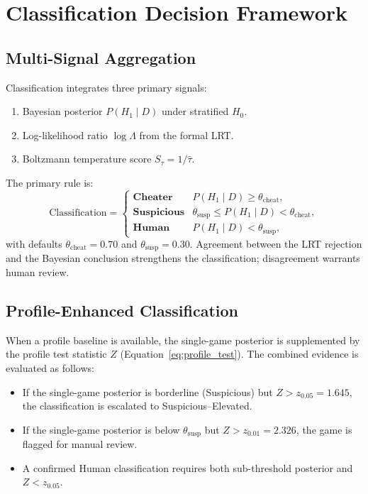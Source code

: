 \documentclass[11pt,a4paper]{article}
\begin{document}
\section{Classification Decision Framework}
\label{sec:classification}

\subsection{Multi-Signal Aggregation}

Classification integrates three primary signals:
\begin{enumerate}
    \item Bayesian posterior $P(H_1 \mid D)$ under stratified $H_0$.
    \item Log-likelihood ratio $\log \Lambda$ from the formal LRT.
    \item Boltzmann temperature score $S_{\tau} = 1/\hat{\tau}$.
\end{enumerate}

The primary rule is:
\begin{equation}
    \text{Classification} = \begin{cases}
        \textbf{Cheater} & P(H_1 \mid D) \geq \theta_{\text{cheat}},\\
        \textbf{Suspicious} & \theta_{\text{susp}} \leq P(H_1 \mid D)
            < \theta_{\text{cheat}},\\
        \textbf{Human} & P(H_1 \mid D) < \theta_{\text{susp}},
    \end{cases}
    \label{eq:classification}
\end{equation}
with defaults $\theta_{\text{cheat}} = 0.70$ and $\theta_{\text{susp}} = 0.30$.
Agreement between the LRT rejection and the Bayesian conclusion strengthens
the classification; disagreement warrants human review.

\subsection{Profile-Enhanced Classification}

When a profile baseline is available, the single-game posterior is supplemented
by the profile test statistic $Z$ (Equation~\eqref{eq:profile_test}). The
combined evidence is evaluated as follows:
\begin{itemize}
    \item If the single-game posterior is borderline (Suspicious) but
          $Z > z_{0.05} = 1.645$, the classification is escalated to
          Suspicious--Elevated.
    \item If the single-game posterior is below $\theta_{\text{susp}}$ but
          $Z > z_{0.01} = 2.326$, the game is flagged for manual review.
    \item A confirmed Human classification requires both sub-threshold posterior
          and $Z < z_{0.05}$.
\end{itemize}
\end{document}

